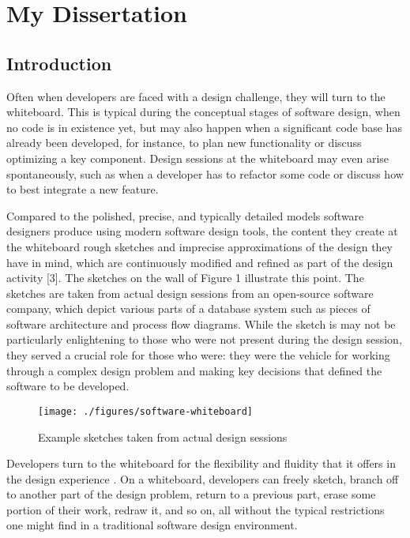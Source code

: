 \chapter{My Dissertation}
\label{chapter:thesis}

\section{Introduction}

Often when developers are faced with a design challenge, they will turn to the whiteboard.  This is typical during the conceptual stages of software design, when no code is in existence yet, but may also happen when a significant code base has already been developed, for instance, to plan new functionality or discuss optimizing a key component. Design sessions at the whiteboard may even arise spontaneously, such as when a developer has to refactor some code or discuss how to best integrate a new feature.

Compared to the polished, precise, and typically detailed models software designers produce using modern software design tools, the content they create at the whiteboard rough sketches and imprecise approximations of the design they have in mind, which are continuously modified and refined as part of the design activity [3]. The sketches on the wall of Figure 1 illustrate this point. The sketches are taken from actual design sessions from an open-source software company, which depict various parts of a database system such as pieces of software architecture and process flow diagrams. While the sketch is may not be particularly enlightening to those who were not present during the design session, they served a crucial role for those who were: they were the vehicle for working through a complex design problem and making key decisions that defined the software to be developed.

\begin{figure*}[tbh]
  \centering
  \texttt{[image: ./figures/software-whiteboard]}
  \caption{Example sketches taken from actual design sessions}
  \label{figure:software-whiteboard}
\end{figure*}

Developers turn to the whiteboard for the flexibility and fluidity that it offers in the design experience \cite{cherubini2007let}. On a whiteboard, developers can freely sketch, branch off to another part of the design problem, return to a previous part, erase some portion of their work, redraw it, and so on, all without the typical restrictions one might find in a traditional software design environment. 

